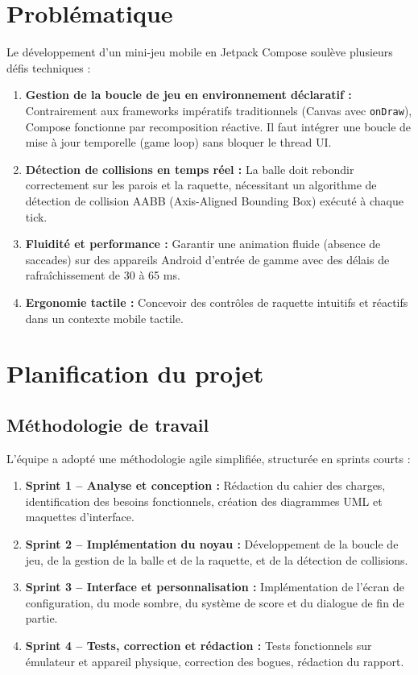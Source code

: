 \documentclass[12pt,a4paper]{report}
\begin{document}
\section{Probl\'ematique}
Le d\'eveloppement d'un mini-jeu mobile en Jetpack Compose soul\`eve plusieurs d\'efis techniques :
\begin{enumerate}
    \item \textbf{Gestion de la boucle de jeu en environnement d\'eclaratif :} Contrairement aux frameworks imp\'eratifs traditionnels (Canvas avec \texttt{onDraw}), Compose fonctionne par recomposition r\'eactive. Il faut int\'egrer une boucle de mise \`a jour temporelle (game loop) sans bloquer le thread UI.
    \item \textbf{D\'etection de collisions en temps r\'eel :} La balle doit rebondir correctement sur les parois et la raquette, n\'ecessitant un algorithme de d\'etection de collision AABB (Axis-Aligned Bounding Box) ex\'ecut\'e \`a chaque tick.
    \item \textbf{Fluidit\'e et performance :} Garantir une animation fluide (absence de saccades) sur des appareils Android d'entr\'ee de gamme avec des d\'elais de rafra\^ichissement de 30 \`a 65 ms.
    \item \textbf{Ergonomie tactile :} Concevoir des contr\^oles de raquette intuitifs et r\'eactifs dans un contexte mobile tactile.
\end{enumerate}

\section{Planification du projet}
\subsection{M\'ethodologie de travail}
L'\'equipe a adopt\'e une m\'ethodologie agile simplifi\'ee, structur\'ee en sprints courts :
\begin{enumerate}
    \item \textbf{Sprint 1 -- Analyse et conception :} R\'edaction du cahier des charges, identification des besoins fonctionnels, cr\'eation des diagrammes UML et maquettes d'interface.
    \item \textbf{Sprint 2 -- Impl\'ementation du noyau :} D\'eveloppement de la boucle de jeu, de la gestion de la balle et de la raquette, et de la d\'etection de collisions.
    \item \textbf{Sprint 3 -- Interface et personnalisation :} Impl\'ementation de l'\'ecran de configuration, du mode sombre, du syst\`eme de score et du dialogue de fin de partie.
    \item \textbf{Sprint 4 -- Tests, correction et r\'edaction :} Tests fonctionnels sur \'emulateur et appareil physique, correction des bogues, r\'edaction du rapport.
\end{enumerate}
\end{document}
